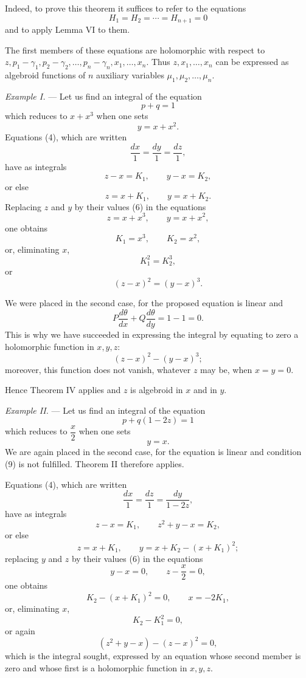 \documentclass[11pt]{article}
\begin{document}
Indeed, to prove this theorem it suffices to refer to the equations
\[
H_1=H_2=\cdots=H_{n+1}=0
\]
and to apply Lemma VI to them.

The first members of these equations are holomorphic with respect to $z,p_1-\gamma_1,p_2-\gamma_2,\ldots,p_n-\gamma_n,x_1,\ldots,x_n$. Thus $z,x_1,\ldots,x_n$ can be expressed as algebroid functions of $n$ auxiliary variables $\mu_1,\mu_2,\ldots,\mu_n$.

\emph{Example I.} — Let us find an integral of the equation
\[
p+q=1
\]
which reduces to $x+x^3$ when one sets
\[
y=x+x^2.
\]
Equations (4), which are written
\[
\frac{dx}{1}=\frac{dy}{1}=\frac{dz}{1},
\]
have as integrals
\begin{equation*}\tag{5}
z-x=K_1,
\qquad y-x=K_2,
\end{equation*}
or else
\begin{equation*}\tag{6}
z=x+K_1,
\qquad y=x+K_2.
\end{equation*}
Replacing $z$ and $y$ by their values (6) in the equations
\[
z=x+x^3,
\qquad y=x+x^2,
\]
one obtains
\[
K_1=x^3,
\qquad K_2=x^2,
\]
or, eliminating $x$,
\[
K_1^2=K_2^3,
\]
or
\[
(z-x)^2=(y-x)^3.
\]

We were placed in the second case, for the proposed equation is linear and
\[
P\frac{d\theta}{dx}+Q\frac{d\theta}{dy}=1-1=0.
\]
This is why we have succeeded in expressing the integral by equating to zero a holomorphic function in $x,y,z$:
\[
(z-x)^2-(y-x)^3;
\]
moreover, this function does not vanish, whatever $z$ may be, when $x=y=0$.

Hence Theorem IV applies and $z$ is algebroid in $x$ and in $y$.

\emph{Example II.} — Let us find an integral of the equation
\[
p+q(1-2z)=1
\]
which reduces to $\dfrac{x}{2}$ when one sets
\[
y=x.
\]
We are again placed in the second case, for the equation is linear and condition (9) is not fulfilled. Theorem II therefore applies.

Equations (4), which are written
\[
\frac{dx}{1}=\frac{dz}{1}=\frac{dy}{1-2z},
\]
have as integrals
\begin{equation*}\tag{5}
z-x=K_1,
\qquad z^2+y-x=K_2,
\end{equation*}
or else
\begin{equation*}\tag{6}
z=x+K_1,
\qquad y=x+K_2-(x+K_1)^2;
\end{equation*}
replacing $y$ and $z$ by their values (6) in the equations
\[
y-x=0,
\qquad z-\frac{x}{2}=0,
\]
one obtains
\[
K_2-(x+K_1)^2=0,
\qquad x=-2K_1,
\]
or, eliminating $x$,
\[
K_2-K_1^2=0,
\]
or again
\begin{equation*}\tag{12}
(z^2+y-x)-(z-x)^2=0,
\end{equation*}
which is the integral sought, expressed by an equation whose second member is zero and whose first is a holomorphic function in $x,y,z$.
\end{document}
